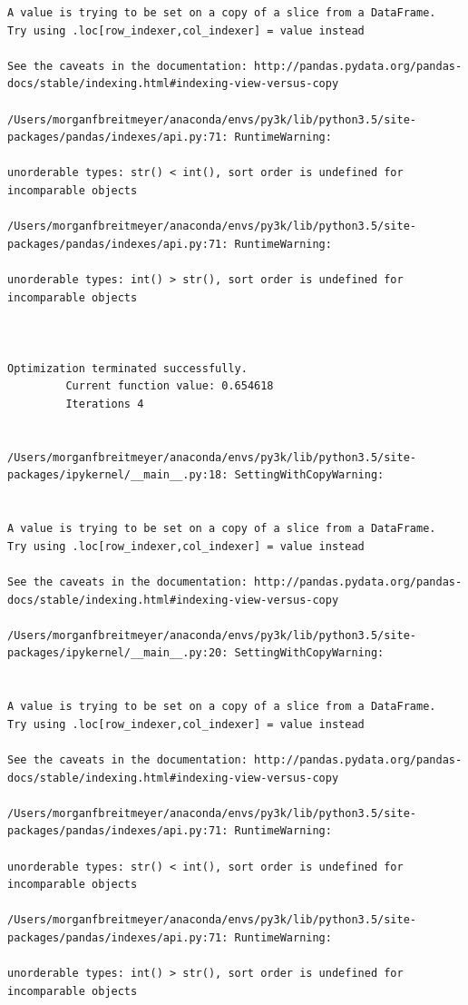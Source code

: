 \begin{lstlisting}
A value is trying to be set on a copy of a slice from a DataFrame.
Try using .loc[row_indexer,col_indexer] = value instead

See the caveats in the documentation: http://pandas.pydata.org/pandas-docs/stable/indexing.html#indexing-view-versus-copy

/Users/morganfbreitmeyer/anaconda/envs/py3k/lib/python3.5/site-packages/pandas/indexes/api.py:71: RuntimeWarning:

unorderable types: str() < int(), sort order is undefined for incomparable objects

/Users/morganfbreitmeyer/anaconda/envs/py3k/lib/python3.5/site-packages/pandas/indexes/api.py:71: RuntimeWarning:

unorderable types: int() > str(), sort order is undefined for incomparable objects



Optimization terminated successfully.
         Current function value: 0.654618
         Iterations 4


/Users/morganfbreitmeyer/anaconda/envs/py3k/lib/python3.5/site-packages/ipykernel/__main__.py:18: SettingWithCopyWarning:


A value is trying to be set on a copy of a slice from a DataFrame.
Try using .loc[row_indexer,col_indexer] = value instead

See the caveats in the documentation: http://pandas.pydata.org/pandas-docs/stable/indexing.html#indexing-view-versus-copy

/Users/morganfbreitmeyer/anaconda/envs/py3k/lib/python3.5/site-packages/ipykernel/__main__.py:20: SettingWithCopyWarning:


A value is trying to be set on a copy of a slice from a DataFrame.
Try using .loc[row_indexer,col_indexer] = value instead

See the caveats in the documentation: http://pandas.pydata.org/pandas-docs/stable/indexing.html#indexing-view-versus-copy

/Users/morganfbreitmeyer/anaconda/envs/py3k/lib/python3.5/site-packages/pandas/indexes/api.py:71: RuntimeWarning:

unorderable types: str() < int(), sort order is undefined for incomparable objects

/Users/morganfbreitmeyer/anaconda/envs/py3k/lib/python3.5/site-packages/pandas/indexes/api.py:71: RuntimeWarning:

unorderable types: int() > str(), sort order is undefined for incomparable objects




\end{lstlisting}

